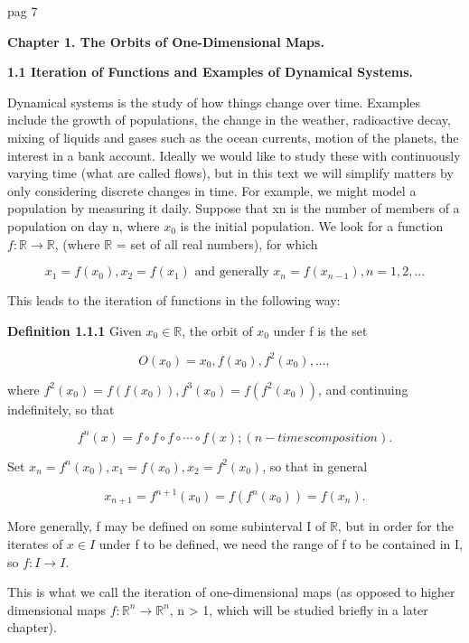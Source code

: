 \documentclass[12pt]{article}
\begin{document}
pag 7

\hfill

\textbf{Chapter 1. The Orbits of One-Dimensional Maps.}

\hfill

\textbf{1.1 Iteration of Functions and Examples of Dynamical Systems.}

\hfill

Dynamical systems is the study of how things change over time. Examples include
the growth of populations, the change in the weather, radioactive decay, mixing of
liquids and gases such as the ocean currents, motion of the planets, the interest in a
bank account. Ideally we would like to study these with continuously varying time
(what are called flows), but in this text we will simplify matters by only considering
discrete changes in time. For example, we might model a population by measuring
it daily. Suppose that xn is the number of members of a population on day n, where
$x_0$ is the initial population. We look for a function $f :\mathbb{R} \to \mathbb{R}$, (where $\mathbb{R}$ = set of all
real numbers), for which

\[
x_1 = f(x_0), x_2 = f(x_1) \text{ and generally } x_n = f(x_{n-1}), n= 1, 2, ...
\]

This leads to the iteration of functions in the following way:

\hfill

\textbf{Definition 1.1.1} Given $x_0 \in \mathbb{R}$, the orbit of $x_0$ under f is the set

\[
O(x_0) = {x_0, f(x_0), f^2(x_0), ...},
\]

where $f^2(x_0) = f(f(x_0)), f^3(x_0) = f(f^2(x_0))$, and continuing indefinitely, so that

\[
f^n(x) = f \circ f \circ f \circ \cdots \circ f(x); (n-times composition).
\]

Set $x_n = f^n(x_0), x_1 = f(x_0), x_2 = f^2(x_0)$, so that in general

\[
x_{n+1} = f^{n+1}(x_0) = f(f^n(x_0)) = f(x_n).
\]


More generally, f may be defined on some subinterval I of $\mathbb{R}$, but in order for the
iterates of $x \in I$ under f to be defined, we need the range of f to be contained in I,
so $f: I \to I$.

\hfill

This is what we call the iteration of one-dimensional maps (as opposed to higher
dimensional maps $f: \mathbb{R}^n \to \mathbb{R}^n$, n > 1, which will be studied briefly in a later
chapter).
\end{document}
